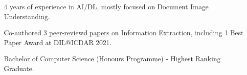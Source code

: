 
\begin{zitemize}
    \item 4 years of experience in AI/DL, mostly focused on Document Image Understanding.
    \item Co-authored \href{https://scholar.google.com/citations?user=iRZlaI8AAAAJ}{3 peer-reviewd papers} on Information Extraction, including 1 Best Paper Award at DIL@ICDAR 2021.
    \item Bachelor of Computer Science (Honours Programme) - Highest Ranking Graduate.
\end{zitemize}
